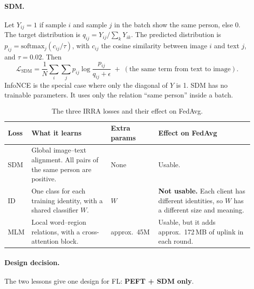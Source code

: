 \paragraph{SDM.} Let $Y_{ij}=1$ if sample $i$ and sample $j$ in the batch show the same person, else $0$. The target distribution is $q_{ij}=Y_{ij}/\sum_k Y_{ik}$. The predicted distribution is $p_{ij}=\mathrm{softmax}_j(c_{ij}/\tau)$, with $c_{ij}$ the cosine similarity between image $i$ and text $j$, and $\tau=0.02$. Then
\begin{equation}\label{eq:sdm}
\mathcal{L}_{\mathrm{SDM}}=\frac1N\sum_i\sum_j p_{ij}\log\frac{p_{ij}}{q_{ij}+\epsilon}\;+\;(\text{the same term from text to image}).
\end{equation}
InfoNCE is the special case where only the diagonal of $Y$ is 1. SDM has no trainable parameters. It uses only the relation ``same person'' inside a batch.

\begin{table}[t]
\centering\small
\caption{The three IRRA losses and their effect on FedAvg.}\label{tab:loss}
\begin{tabularx}{\textwidth}{l X l X}
\toprule
Loss & What it learns & Extra params & Effect on FedAvg\\
\midrule
SDM & Global image--text alignment. All pairs of the same person are positive. & None & Usable.\\
ID & One class for each training identity, with a shared classifier $W$. & $W$ & \textbf{Not usable.} Each client has different identities, so $W$ has a different size and meaning.\\
MLM & Local word--region relations, with a cross-attention block. & approx.\ 45M & Usable, but it adds approx.\ 172\,MB of uplink in each round.\\
\bottomrule
\end{tabularx}
\end{table}

\paragraph{Design decision.} The two lessons give one design for FL: \textbf{PEFT + SDM only}.

